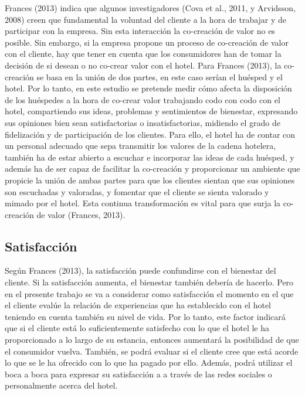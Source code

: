 Frances (2013) indica que algunos investigadores (Cova et al., 2011, y Arvidsson, 2008) creen que fundamental la voluntad del cliente a la hora de trabajar y de participar con la empresa. Sin esta interacción la co-creación de valor no es posible. Sin embargo, si la empresa propone un proceso de co-creación de valor con el cliente, hay que tener en cuenta que los consumidores han de tomar la decisión de si desean o no co-crear valor con el hotel. Para Frances (2013), la co-creación se basa en la unión de dos partes, en este caso serían el huésped y el hotel. Por lo tanto, en este estudio se pretende medir cómo afecta la disposición de los huéspedes a la hora de co-crear valor trabajando codo con codo con el hotel, compartiendo sus ideas, problemas y sentimientos de bienestar, expresando sus opiniones bien sean satisfactorias o insatisfactorias, midiendo el grado de fidelización y de participación de los clientes. Para ello, el hotel ha de contar con un personal adecuado que sepa transmitir los valores de la cadena hotelera, también ha de estar abierto a escuchar e incorporar las ideas de cada huésped, y además ha de ser capaz de facilitar la co-creación y proporcionar un ambiente que propicie la unión de ambas partes para que los clientes sientan que sus opiniones son escuchadas y valoradas, y fomentar que el cliente se sienta valorado y mimado por el hotel. Esta continua transformación es vital para que surja la co-creación de valor (Frances, 2013). 

\subsection{Satisfacción}

Según Frances (2013), la satisfacción puede confundirse con el bienestar del cliente. Si la satisfacción aumenta, el bienestar también debería de hacerlo. Pero en el presente trabajo se va a considerar como satisfacción el momento en el que el cliente evalúe la relación de experiencias que ha establecido con el hotel teniendo en cuenta también su nivel de vida. Por lo tanto, este factor indicará que si el cliente está lo suficientemente satisfecho con lo que el hotel le ha proporcionado a lo largo de su estancia, entonces aumentará la posibilidad de que el consumidor vuelva. También, se podrá evaluar si el cliente cree que está acorde lo que se le ha ofrecido con lo que ha pagado por ello. Además, podrá utilizar el boca a boca para expresar su satisfacción a a través de las redes sociales o personalmente acerca del hotel.

